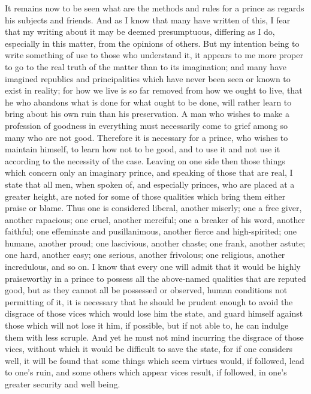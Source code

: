 \documentclass[12pt,letterpaper]{memoir}
\begin{document}
It remains now to be seen what are the methods and rules for a
prince as regards his subjects and friends. And as I know that many
have written of this, I fear that my writing about it may be deemed
presumptuous, differing as I do, especially in this matter, from the
opinions of others. But my intention being to write something of use to
those who understand it, it appears to me more proper to go to the real
truth of the matter than to its imagination; and many have imagined
republics and principalities which have never been seen or known to
exist in reality; for how we live is so far removed from how we ought
to live, that he who abandons what is done for what ought to be done,
will rather learn to bring about his own ruin than his preservation.
A man who wishes to make a profession of goodness in everything must
necessarily come to grief among so many who are not good. Therefore it
is necessary for a prince, who wishes to maintain himself, to learn how
not to be good, and to use it and not use it according to the necessity
of the case. Leaving on one side then those things which concern only
an imaginary prince, and speaking of those that are real, I state that
all men, when spoken of, and especially princes, who are placed at
a greater height, are noted for some of those qualities which bring
them either praise or blame. Thus one is considered liberal, another
miserly; one a free giver, another rapacious; one cruel, another
merciful; one a breaker of his word, another faithful; one effeminate
and pusillanimous, another fierce and high-spirited; one humane,
another proud; one lascivious, another chaste; one frank, another
astute; one hard, another easy; one serious, another frivolous; one
religious, another incredulous, and so on. I know that every one will
admit that it would be highly praiseworthy in a prince to possess all
the above-named qualities that are reputed good, but as they cannot all
be possessed or observed, human conditions not permitting of it, it is
necessary that he should be prudent enough to avoid the disgrace of
those vices which would lose him the state, and guard himself against
those which will not lose it him, if possible, but if not able to, he
can indulge them with less scruple. And yet he must not mind incurring
the disgrace of those vices, without which it would be difficult to
save the state, for if one considers well, it will be found that some
things which seem virtues would, if followed, lead to one's ruin, and
some others which appear vices result, if followed, in one's greater
security and well being.
\end{document}
